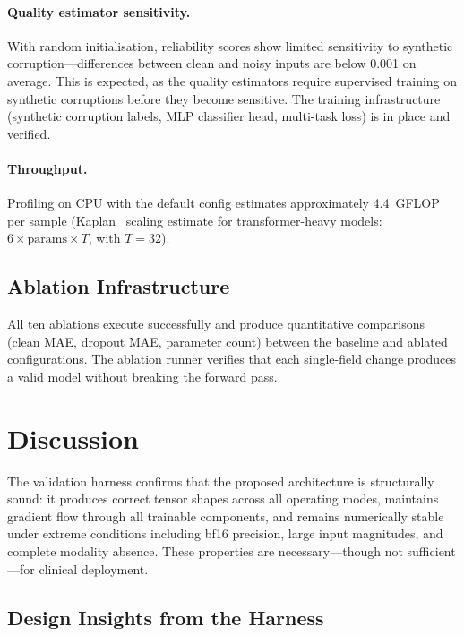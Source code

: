 \documentclass{article}
\begin{document}
\paragraph{Quality estimator sensitivity.} With random initialisation, reliability
scores show limited sensitivity to synthetic corruption---differences between clean
and noisy inputs are below 0.001 on average. This is expected, as the quality estimators
require supervised training on synthetic corruptions before they become sensitive.
The training infrastructure (synthetic corruption labels, MLP classifier head,
multi-task loss) is in place and verified.

\paragraph{Throughput.} Profiling on CPU with the default config estimates approximately
4.4~GFLOP per sample (Kaplan~\etal{} scaling estimate for transformer-heavy models:
$6 \times \text{params} \times T$, with $T = 32$).

\subsection{Ablation Infrastructure}

All ten ablations execute successfully and produce quantitative comparisons
(clean MAE, dropout MAE, parameter count) between the baseline and ablated
configurations. The ablation runner verifies that each single-field change produces
a valid model without breaking the forward pass.


\section{Discussion}
\label{sec:discussion}

The validation harness confirms that the proposed architecture is structurally sound:
it produces correct tensor shapes across all operating modes, maintains gradient flow
through all trainable components, and remains numerically stable under extreme conditions
including bf16 precision, large input magnitudes, and complete modality absence. These
properties are necessary---though not sufficient---for clinical deployment.

\subsection{Design Insights from the Harness}
\end{document}
